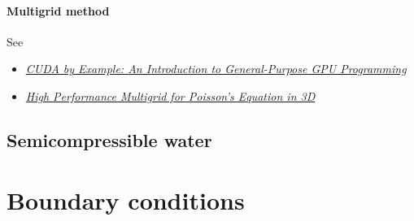 \paragraph{Multigrid method}

See
\begin{itemize}
    \item \textit{\href{http://developer.download.nvidia.com/books/cuda-by-example/cuda-by-example-sample.pdf}{CUDA by Example: An Introduction to General-Purpose GPU Programming}}
    \item \textit{\href{http://people.freebsd.org/~snb/school/hp_mg.pdf}{High Performance Multigrid for Poisson's Equation in 3D}}
\end{itemize}


\subsection{Semicompressible water}

\section{Boundary conditions}